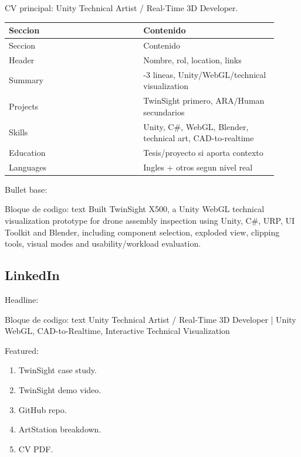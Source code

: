 CV principal: Unity Technical Artist / Real-Time 3D Developer.


\begin{center}
\scriptsize
\begin{longtable}{>{\raggedright\arraybackslash}p{0.455\linewidth} >{\raggedright\arraybackslash}p{0.455\linewidth}}
\toprule
Seccion & Contenido \\
\midrule
\endfirsthead
\toprule
Seccion & Contenido \\
\midrule
\endhead
Header & Nombre, rol, location, links \\
Summary & 2-3 lineas, Unity/WebGL/technical visualization \\
Projects & TwinSight primero, ARA/Human secundarios \\
Skills & Unity, C\#, WebGL, Blender, technical art, CAD-to-realtime \\
Education & Tesis/proyecto si aporta contexto \\
Languages & Ingles + otros segun nivel real \\
\bottomrule
\end{longtable}
\end{center}



Bullet base:


\begin{mdcode}
Bloque de codigo: text
Built TwinSight X500, a Unity WebGL technical visualization prototype for drone assembly inspection using Unity, C#, URP, UI Toolkit and Blender, including component selection, exploded view, clipping tools, visual modes and usability/workload evaluation.
\end{mdcode}


\subsection{LinkedIn}


Headline:


\begin{mdcode}
Bloque de codigo: text
Unity Technical Artist / Real-Time 3D Developer | Unity WebGL, CAD-to-Realtime, Interactive Technical Visualization
\end{mdcode}


Featured:


\begin{enumerate}
\item TwinSight case study.
\item TwinSight demo video.
\item GitHub repo.
\item ArtStation breakdown.
\item CV PDF.
\end{enumerate}


